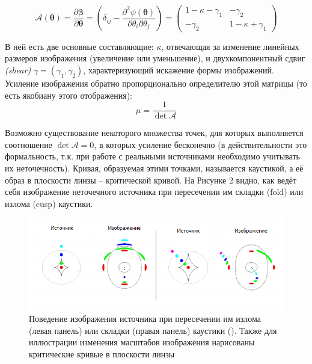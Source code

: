 \begin{equation}
\mathcal{A}(\boldsymbol{\theta})=\frac{\partial \boldsymbol{\beta}}{\partial \boldsymbol{\theta}}=\left(\delta_{i j}-\frac{\partial^{2} \psi(\boldsymbol{\theta})}{\partial \theta_{i} \partial \theta_{j}}\right)=\left(\begin{array}{cc}{1-\kappa-\gamma_{1}} & {-\gamma_{2}} \\ {-\gamma_{2}} & {1-\kappa+\gamma_{1}}\end{array}\right)
\end{equation}

В ней есть две основные составляющие: $\kappa$, отвечающая за изменение линейных размеров изображения (увеличение или уменьшение), и двухкомпонентный сдвиг \textit{(shear)} $\gamma=(\gamma_1,\gamma_2)$, характеризующий искажение формы изображений. Усиление изображения обратно пропорционально определителю этой матрицы (то есть якобиану этого отображения):
\begin{equation}
\mu=\frac{1}{\operatorname{det} \mathcal{A}}
\end{equation}

Возможно существование некоторого множества точек, для которых выполняется соотношение $\operatorname{det} \mathcal{A}=0$, в которых усиление бесконечно (в действительности это формальность, т.к. при работе с реальными источниками необходимо учитывать их неточечность).  Кривая, образуемая этими точками, называется каустикой, а её образ в плоскости линзы – критической кривой. На Рисунке 2 видно, как ведёт себя изображение неточечного источника при пересечении им складки (fold) или излома (cusp) каустики.
 
\begin{figure}[H]
    \centering
	\includegraphics[scale=0.8]{pics/caust_intro.png}
	\caption{Поведение изображения источника при пересечении им излома (левая панель) или складки (правая панель) каустики  (\cite{narbart}). Также для иллюстрации изменения масштабов изображения нарисованы критические кривые в плоскости линзы}
\end{figure}

